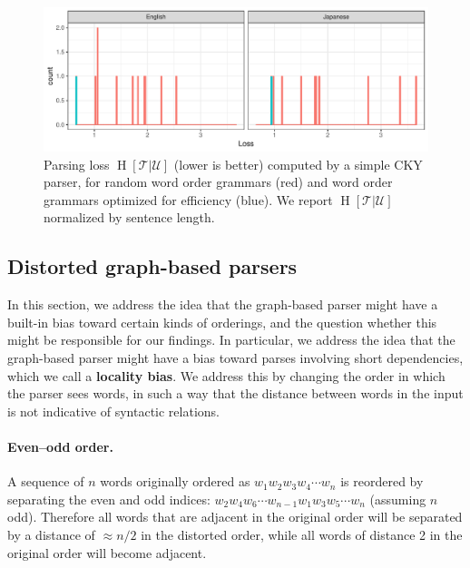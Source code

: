 \documentclass[10pt,twoside,lineno]{article}
\newcommand{\key}[1]{\textbf{#1}}
\newcommand{\utterance}{\mathcal{U}}
\newcommand{\tree}{\mathcal{T}}
\begin{document}
\begin{figure}
    \centering
    \includegraphics[scale=.7]{../results/cky/cky-parse.pdf} 
	\caption{Parsing loss $\operatorname{H}[\tree|\utterance]$ (lower is better) computed by a simple CKY parser, for random word order grammars (red) and word order grammars optimized for efficiency (blue). We report $\operatorname{H}[\tree|\utterance]$ normalized by sentence length.}
    \label{fig:cky-parser}
\end{figure}



\subsection{Distorted graph-based parsers}
\label{sec:distorted}

In this section, we address the idea that the graph-based parser might have a built-in bias toward certain kinds of orderings, and the question whether this might be responsible for our findings.
In particular, we address the idea that the graph-based parser might have a bias toward parses involving short dependencies, which we call a \key{locality bias}. 
We address this by changing the order in which the parser sees words, in such a way that the distance between words in the input is not indicative of syntactic relations.




\paragraph{Even--odd order.} A sequence of $n$ words originally ordered as $w_1 w_2 w_3 w_4 \cdots w_n$ is reordered by separating the even and odd indices: $w_2 w_4 w_6 \cdots w_{n-1} w_1 w_3 w_5 \cdots w_n$ (assuming $n$ odd). Therefore all words that are adjacent in the original order will be separated by a distance of $\approx n/2$ in the distorted order, while all words of distance 2 in the original order will become adjacent.
\end{document}
